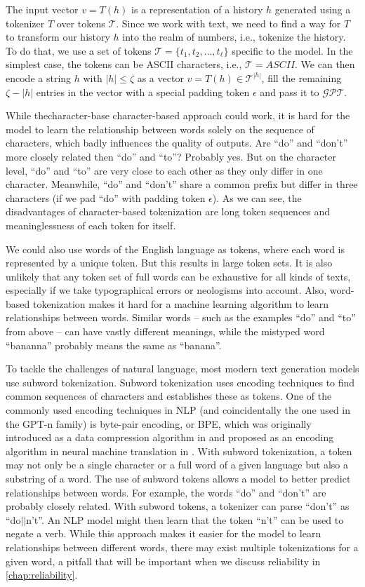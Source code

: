The input vector $v=T(h)$ is a representation of a history $h$ generated using a tokenizer $T$ over tokens $\mathcal{T}$.
Since we work with text, we need to find a way for $T$ to transform our history $h$ into the realm of numbers, i.e., tokenize the history.
To do that, we use a set of tokens $\mathcal{T} = \{ t_1, t_2, \dots, t_\ell \}$ specific to the model.
In the simplest case, the tokens can be ASCII characters, i.e., $\mathcal{T} = ASCII$.
We can then encode a string $h$ with $|h| \leq \zeta$ as a vector $v = T(h) \in \mathcal{T}^{|h|}$, fill the remaining $\zeta - |h|$ entries in the vector with a special padding token $\epsilon$ and pass it to $\mathcal{GPT}$.
  
While thecharacter-base character-based approach could work, it is hard for the model to learn the relationship between words solely on the sequence of characters, which badly influences the quality of outputs.
Are ``do'' and ``don't'' more closely related then ``do'' and ``to''?
Probably yes.
But on the character level, ``do'' and ``to'' are very close to each other as they only differ in one character.
Meanwhile, ``do'' and ``don't'' share a common prefix but differ in three characters (if we pad ``do'' with padding token $\epsilon$).
As we can see, the disadvantages of character-based tokenization are long token sequences and meaninglessness of each token for itself.

We could also use words of the English language as tokens, where each word is represented by a unique token.
But this results in large token sets.
It is also unlikely that any token set of full words can be exhaustive for all kinds of texts, especially if we take typographical errors or neologisms into account.
Also, word-based tokenization makes it hard for a machine learning algorithm to learn relationships between words.
Similar words -- such as the examples ``do'' and ``to'' from above -- can have vastly different meanings, while the mistyped word ``bananna'' probably means the same as ``banana''.

To tackle the challenges of natural language, most modern text generation models use subword tokenization.
Subword tokenization uses encoding techniques to find common sequences of characters and establishes these as tokens.
One of the commonly used encoding techniques in NLP (and coincidentally the one used in the GPT-n family) is byte-pair encoding, or BPE, which was originally introduced as a data compression algorithm in \cite{BPE1994} and proposed as an encoding algorithm in neural machine translation in \cite{BPENMT2016}.
With subword tokenization, a token may not only be a single character or a full word of a given language but also a substring of a word.
The use of subword tokens allows a model to better predict relationships between words.
For example, the words ``do'' and ``don't'' are probably closely related.
With subword tokens, a tokenizer can parse ``don't'' as ``do$||$n't''. 
An NLP model might then learn that the token ``n't'' can be used to negate a verb.
While this approach makes it easier for the model to learn relationships between different words, there may exist multiple tokenizations for a given word, a pitfall that will be important when we discuss reliability in \autoref{chap:reliability}.

